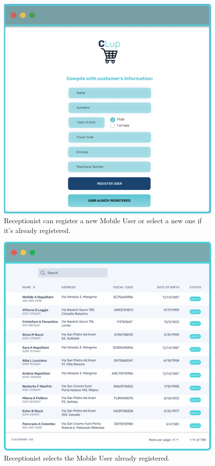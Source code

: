 \begin{figure}[H]
  \caption{Receptionist can register a new Mobile User or select a new one if it's already registered.}
  \label{fig:Login}
  \centering
  \includegraphics[scale=0.32]{images/mockup/LOGREG.png}

\end{figure}

\begin{figure}[H]
  \caption{Receptionist selects the Mobile User already registered.}
  \label{fig:Login}
  \centering
  \includegraphics[scale=0.32]{images/mockup/Select_User.png}

\end{figure}

